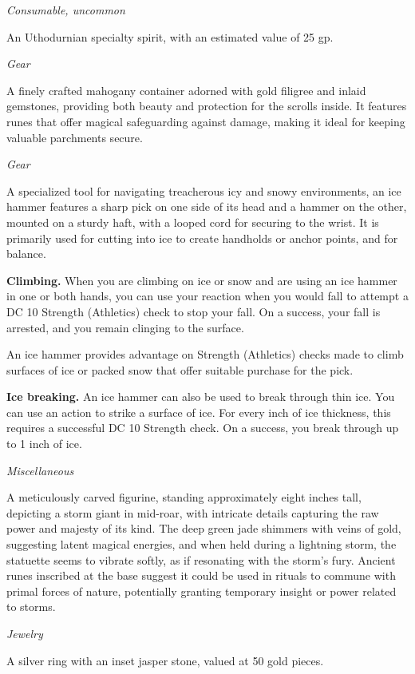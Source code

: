 \documentclass[
  letterpaper,12pt,twoside,twocolumn,openany,
  nodeprecatedcode,bg=full]{dndbook}
\begin{document}
{\emph{Consumable, uncommon}}

An Uthodurnian specialty spirit, with an estimated value of 25 gp.

{\emph{Gear}}

A finely crafted mahogany container adorned with gold filigree and
inlaid gemstones, providing both beauty and protection for the scrolls
inside. It features runes that offer magical safeguarding against
damage, making it ideal for keeping valuable parchments secure.

{\emph{Gear}}

A specialized tool for navigating treacherous icy and snowy
environments, an ice hammer features a sharp pick on one side of its
head and a hammer on the other, mounted on a sturdy haft, with a looped
cord for securing to the wrist. It is primarily used for cutting into
ice to create handholds or anchor points, and for balance.

\textbf{Climbing.} When you are climbing on ice or snow and are using an
ice hammer in one or both hands, you can use your reaction when you
would fall to attempt a DC 10 Strength (Athletics) check to stop your
fall. On a success, your fall is arrested, and you remain clinging to
the surface.

An ice hammer provides advantage on Strength (Athletics) checks made to
climb surfaces of ice or packed snow that offer suitable purchase for
the pick.

\textbf{Ice breaking.} An ice hammer can also be used to break through
thin ice. You can use an action to strike a surface of ice. For every
inch of ice thickness, this requires a successful DC 10 Strength check.
On a success, you break through up to 1 inch of ice.

{\emph{Miscellaneous}}

A meticulously carved figurine, standing approximately eight inches
tall, depicting a storm giant in mid-roar, with intricate details
capturing the raw power and majesty of its kind. The deep green jade
shimmers with veins of gold, suggesting latent magical energies, and
when held during a lightning storm, the statuette seems to vibrate
softly, as if resonating with the storm's fury. Ancient runes inscribed
at the base suggest it could be used in rituals to commune with primal
forces of nature, potentially granting temporary insight or power
related to storms.

{\emph{Jewelry}}

A silver ring with an inset jasper stone, valued at 50 gold pieces.
\end{document}
